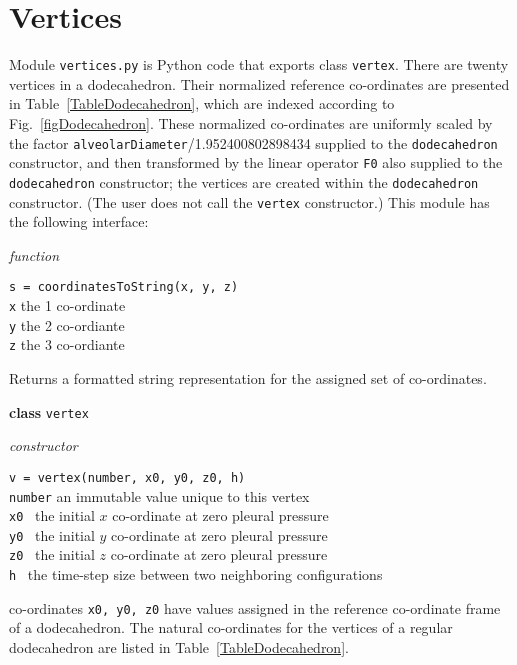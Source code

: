 \section{Vertices}
\label{appVertices}

Module \texttt{vertices.py} is Python code that exports class \texttt{vertex}.  There are twenty vertices in a dodecahedron.  Their normalized reference co-ordinates are presented in Table~\ref{TableDodecahedron}, which are indexed according to Fig.~\ref{figDodecahedron}.  These normalized co-ordinates are uniformly scaled by the factor \texttt{alveolarDiameter}/1.952400802898434 supplied to the \texttt{dodecahedron} constructor, and then transformed by the linear operator \texttt{F0} also supplied to the \texttt{dodecahedron} constructor; the vertices are created within the \texttt{dodecahedron} constructor.  (The user does not call the \texttt{vertex} constructor.)  This module has the following interface:

\medskip\noindent
\textit{function}

\medskip\noindent
\texttt{s = coordinatesToString(x, y, z)} \\
\indent \texttt{x} \; the 1 co-ordinate \\
\indent \texttt{y} \; the 2 co-ordiante \\
\indent \texttt{z} \; the 3 co-ordiante 

\medskip\noindent
Returns a formatted string representation for the assigned set of co-ordinates.

\bigskip\noindent
\textbf{class} \texttt{vertex}

\medskip\noindent
\textit{constructor}

\medskip\noindent
\texttt{v = vertex(number, x0, y0, z0, h)} \\
\indent \texttt{number} \; an immutable value unique to this vertex \\
\indent \texttt{x0} \qquad\;\, the initial $x$ co-ordinate at zero pleural pressure \\
\indent \texttt{y0} \qquad\;\, the initial $y$ co-ordinate at zero pleural pressure \\
\indent \texttt{z0} \qquad\;\, the initial $z$ co-ordinate at zero pleural pressure \\
\indent \texttt{h\phantom{0}} \qquad\;\, the time-step size between two neighboring configurations

\medskip\noindent
co-ordinates \texttt{x0, y0, z0} have values assigned in the reference co-ordinate frame of a dodecahedron.  The natural co-ordinates for the vertices of a regular dodecahedron are listed in Table~\ref{TableDodecahedron}.

